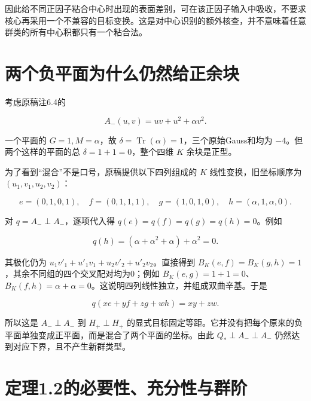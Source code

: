 \documentclass[UTF8,fontset=fandol,zihao=-4,openany,oneside]{ctexbook}
\begin{document}
因此给不同正因子粘合中心时出现的表面差别，可在该正因子输入中吸收，不要求核心再采用一个不兼容的目标变换。这是对中心识别的额外核查，并不意味着任意群类的所有中心积都只有一个粘合法。



\section{两个负平面为什么仍然给正余块}


考虑原稿注6.4的



\[
A_-(u,v)=uv+u^2+\alpha v^2.
\]



一个平面的 \(G=1,M=\alpha\)，故 \(\delta=\operatorname{Tr}(\alpha)=1\)，三个原始Gauss和均为 \(-4\)。但两个这样的平面的总 \(\delta=1+1=0\)，整个四维 \(K\) 余块是正型。



为了看到“混合”不是口号，原稿提供以下四列组成的 \(K\) 线性变换，旧坐标顺序为 \((u_1,v_1,u_2,v_2)\)：



\[
e=(0,1,0,1),\quad f=(0,1,1,1),\quad
g=(1,0,1,0),\quad h=(\alpha,1,\alpha,0).
\]



对 \(q=A_-\perp A_-\)，逐项代入得 \(q(e)=q(f)=q(g)=q(h)=0\)。例如



\[
q(h)=(\alpha+\alpha^2+\alpha)+\alpha^2=0.
\]



其极化仍为 \(u_1v'_1+u'_1v_1+u_2v'_2+u'_2v_2\)。直接得到 \(B_K(e,f)=B_K(g,h)=1\)，其余不同组的四个交叉配对均为0；例如 \(B_K(e,g)=1+1=0\)、\(B_K(f,h)=\alpha+\alpha=0\)。这说明四列线性独立，并组成双曲辛基。于是



\[
q(xe+yf+zg+wh)=xy+zw.
\]



所以这是 \(A_-\perp A_-\) 到 \(H_+\perp H_+\) 的显式目标固定等距。它并没有把每个原来的负平面单独变成正平面，而是混合了两个平面的坐标。由此 \(Q_*\perp A_-\perp A_-\) 仍然达到对应下界，且不产生新群类型。



\section{定理1.2的必要性、充分性与群阶}
\end{document}
